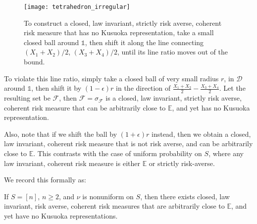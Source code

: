 \begin{figure}[h]
	\centering
	\texttt{[image: tetrahedron\_irregular]}
	\caption{To construct a closed, law invariant, strictly risk averse, coherent risk measure that has no Kusuoka representation, take a small closed ball around \(\mathds{1}\), then shift it along the line connecting \((X_1 + X_2)/2\), \((X_3 + X_4)/2\), until its line ratio moves out of the bound.}
	\label{fig:tetrahedron_irregular}
\end{figure}

To violate this line ratio, simply take a closed ball of very small radius \(r\), in \(\mathscr{D}\) around \(\mathds{1}\), then shift it by \((1-\epsilon)r\) in the direction of \(\frac{X_1 + X_2}{2} - \frac{X_3 + X_4}{2}\). Let the resulting set be \(\mathscr{F}\), then \(\mathcal{F} = \sigma_{\mathscr{F}}\) is a closed, law invariant, strictly risk averse, coherent risk measure that can be arbitrarily close to \(\mathbb{E}\), and yet has no Kusuoka representation.

Also, note that if we shift the ball by \((1 + \epsilon)r\) instead, then we obtain a closed, law invariant, coherent risk measure that is not risk averse, and can be arbitrarily close to \(\mathbb{E}\). This contrasts with the case of uniform probability on \(S\), where any law invariant, coherent risk measure is either \(\mathbb{E}\) or strictly risk-averse.

We record this formally as:

\begin{prop}
	If $S = [n]$, $ n \ge 2$, and $\nu$ is nonuniform on $S$, then there exists closed, law invariant, risk averse, coherent risk measures that are arbitrarily close to $\mathbb{E}$, and yet have no Kusuoka representations.
\end{prop}

